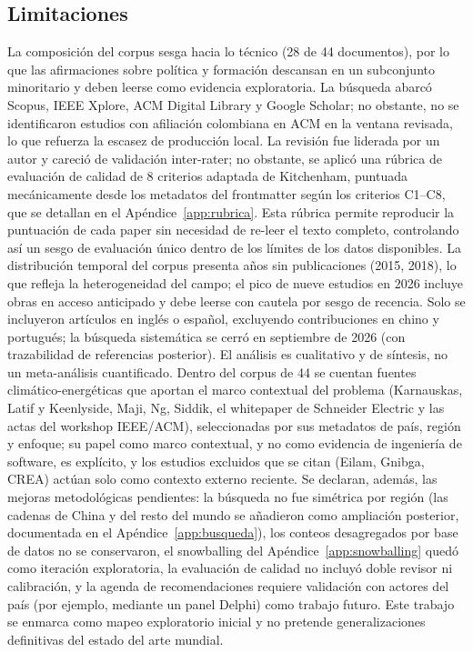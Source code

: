 \documentclass[conference]{IEEEtran}
\begin{document}
\subsection{Limitaciones}\label{sec:lim}
La composici\'on del corpus sesga hacia lo t\'ecnico (28 de 44 documentos), por lo que las afirmaciones sobre pol\'itica y formaci\'on descansan en un subconjunto minoritario y deben leerse como evidencia exploratoria. La b\'usqueda abarc\'o Scopus, IEEE Xplore, ACM Digital Library y Google Scholar; no obstante, no se identificaron estudios con afiliaci\'on colombiana en ACM en la ventana revisada, lo que refuerza la escasez de producci\'on local. La revisi\'on fue liderada por un autor y careci\'o de validaci\'on inter-rater; no obstante, se aplic\'o una r\'ubrica de evaluaci\'on de calidad de 8 criterios adaptada de Kitchenham, puntuada mec\'anicamente desde los metadatos del frontmatter seg\'un los criterios C1--C8, que se detallan en el Ap\'endice~\ref{app:rubrica}. Esta r\'ubrica permite reproducir la puntuaci\'on de cada paper sin necesidad de re-leer el texto completo, controlando as\'i un sesgo de evaluaci\'on \'unico dentro de los l\'imites de los datos disponibles. La distribuci\'on temporal del corpus presenta años sin publicaciones (2015, 2018), lo que refleja la heterogeneidad del campo; el pico de nueve estudios en 2026 incluye obras en acceso anticipado y debe leerse con cautela por sesgo de recencia. Solo se incluyeron art\'iculos en ingl\'es o español, excluyendo contribuciones en chino y portugu\'es; la b\'usqueda sistem\'atica se cerr\'o en septiembre de 2026 (con trazabilidad de referencias posterior). El an\'alisis es cualitativo y de s\'intesis, no un meta-an\'alisis cuantificado. Dentro del corpus de 44 se cuentan fuentes clim\'atico-energ\'eticas que aportan el marco contextual del problema (Karnauskas, Latif y Keenlyside, Maji, Ng, Siddik, el whitepaper de Schneider Electric y las actas del workshop IEEE/ACM), seleccionadas por sus metadatos de pa\'is, regi\'on y enfoque; su papel como marco contextual, y no como evidencia de ingenier\'ia de software, es expl\'icito, y los estudios excluidos que se citan (Eilam, Gnibga, CREA) act\'uan solo como contexto externo reciente. Se declaran, adem\'as, las mejoras metodol\'ogicas pendientes: la b\'usqueda no fue sim\'etrica por regi\'on (las cadenas de China y del resto del mundo se añadieron como ampliaci\'on posterior, documentada en el Ap\'endice~\ref{app:busqueda}), los conteos desagregados por base de datos no se conservaron, el snowballing del Ap\'endice~\ref{app:snowballing} qued\'o como iteraci\'on exploratoria, la evaluaci\'on de calidad no incluy\'o doble revisor ni calibraci\'on, y la agenda de recomendaciones requiere validaci\'on con actores del pa\'is (por ejemplo, mediante un panel Delphi) como trabajo futuro. Este trabajo se enmarca como mapeo exploratorio inicial y no pretende generalizaciones definitivas del estado del arte mundial.
\end{document}
